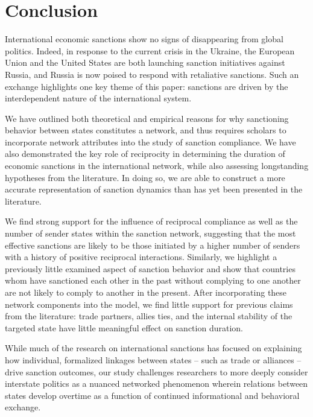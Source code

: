 \section*{Conclusion}
\label{conclusion}

International economic sanctions show no signs of disappearing from global politics. Indeed, in response to the current crisis in the Ukraine, the European Union and the United States are both launching sanction initiatives against Russia, and Russia is now poised to respond with retaliative sanctions. Such an exchange highlights one key theme of this paper: sanctions are driven by the interdependent nature of the international system. 

We have outlined both theoretical and empirical reasons for why sanctioning behavior between states constitutes a network, and thus requires scholars to incorporate network attributes into the study of sanction compliance. We have also demonstrated the key role of reciprocity in determining the duration of economic sanctions in the international network, while also assessing longstanding hypotheses from the literature. In doing so, we are able to construct a more accurate representation of sanction dynamics than has yet been presented in the literature. 

We find strong support for the influence of reciprocal compliance as well as the number of sender states within the sanction network, suggesting that the most effective sanctions are likely to be those initiated by a higher number of senders with a history of positive reciprocal interactions. Similarly, we highlight a previously little examined aspect of sanction behavior and show that countries whom have sanctioned each other in the past without complying to one another are not likely to comply to another in the present. After incorporating these network components into the model, we find little support for previous claims from the literature: trade partners, allies ties, and the internal stability of the targeted state have little meaningful effect on sanction duration.

While much of the research on international sanctions has focused on explaining how individual, formalized linkages between states -- such as trade or alliances -- drive sanction outcomes, our study challenges researchers to more deeply consider interstate politics as a nuanced networked phenomenon wherein relations between states develop overtime as a function of continued informational and behavioral exchange. 

